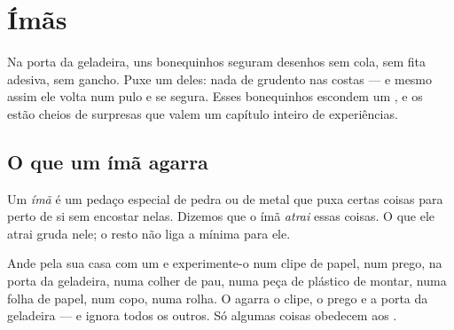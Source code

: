 \chapter{Ímãs}\label{ch:g1:magnets}

Na porta da geladeira, uns bonequinhos seguram desenhos sem cola, sem
fita adesiva, sem gancho. Puxe um deles: nada de grudento nas costas
--- e mesmo assim ele volta num pulo e se segura. Esses bonequinhos
escondem um , e os  estão cheios de surpresas que valem um
capítulo inteiro de experiências.

\section{O que um ímã agarra}

\begin{definition}[Ímãs]\label{def:g1:magnets:magnet}
Um \emph{ímã} é um pedaço especial de pedra ou de metal
que puxa certas coisas para perto de si sem encostar nelas. Dizemos
que o ímã \emph{atrai} essas coisas. O que ele atrai
gruda nele; o resto não liga a mínima para ele.
\end{definition}

\begin{example}\label{ex:g1:magnets:test}
Ande pela sua casa com um  e experimente-o num clipe de papel, num
prego, na porta da geladeira, numa colher de pau, numa peça de
plástico de montar, numa folha de papel, num copo, numa rolha. O 
agarra o clipe, o prego e a porta da geladeira --- e ignora todos os
outros. Só algumas coisas obedecem aos .
\end{example}

